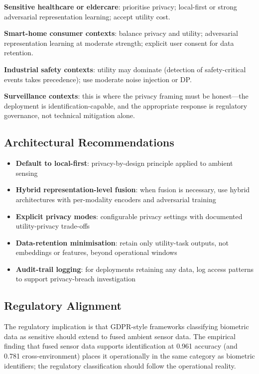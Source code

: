 \documentclass[sigconf,nonacm]{acmart}
\begin{document}
\textbf{Sensitive healthcare or eldercare}: prioritise privacy;
local-first or strong adversarial representation learning;
accept utility cost.

\textbf{Smart-home consumer contexts}: balance privacy and
utility; adversarial representation learning at moderate strength;
explicit user consent for data retention.

\textbf{Industrial safety contexts}: utility may dominate
(detection of safety-critical events takes precedence); use
moderate noise injection or DP.

\textbf{Surveillance contexts}: this is where the privacy framing
must be honest---the deployment is identification-capable, and the
appropriate response is regulatory governance, not technical
mitigation alone.

\subsection{Architectural Recommendations}

\begin{itemize}
  \item \textbf{Default to local-first}: privacy-by-design
        principle applied to ambient sensing
  \item \textbf{Hybrid representation-level fusion}: when fusion
        is necessary, use hybrid architectures with per-modality
        encoders and adversarial training
  \item \textbf{Explicit privacy modes}: configurable privacy
        settings with documented utility-privacy trade-offs
  \item \textbf{Data-retention minimisation}: retain only
        utility-task outputs, not embeddings or features, beyond
        operational windows
  \item \textbf{Audit-trail logging}: for deployments retaining
        any data, log access patterns to support privacy-breach
        investigation
\end{itemize}

\subsection{Regulatory Alignment}

The regulatory implication is that GDPR-style frameworks
classifying biometric data as sensitive should extend to fused
ambient sensor data. The empirical finding that fused sensor data
supports identification at 0.961 accuracy (and 0.781
cross-environment) places it operationally in the same category
as biometric identifiers; the regulatory classification should
follow the operational reality.
\end{document}
